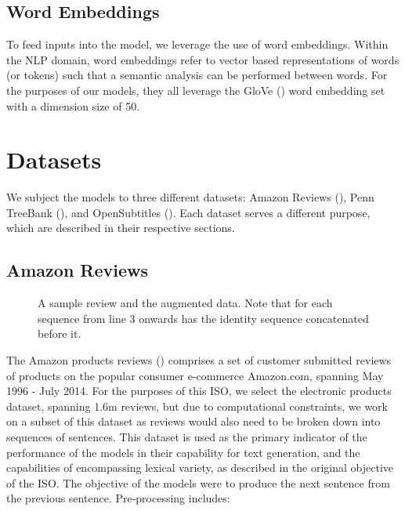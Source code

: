 \documentclass[12pt,twoside]{report}
\begin{document}
\subsection*{Word Embeddings}
\label{word_embeddings}

To feed inputs into the model, we leverage the use of word embeddings. Within the NLP domain, word embeddings refer to vector based representations of words (or tokens) such that a semantic analysis can be performed between words. For the purposes of our models, they all  leverage the GloVe (\cite{pennington_glove:_2014}) word embedding set with a dimension size of 50.

\section{Datasets}

We subject the models to three different datasets: Amazon Reviews (\cite{he_ups_2016}), Penn TreeBank (\cite{marcus_building_2002}), and OpenSubtitles (\cite{lison_opensubtitles2016:_2016}). Each dataset serves a different purpose, which are described in their respective sections.

\subsection{Amazon Reviews}

\begin{figure}[!ht]
	\centering
	
	
	\caption{A sample review and the augmented data. Note that for each sequence from line 3 onwards has the identity sequence concatenated before it. \label{ex_dataset:amazon}}
\end{figure}

The Amazon products reviews (\cite{he_ups_2016}) comprises a set of customer submitted reviews of products on the popular consumer e-commerce Amazon.com, spanning May 1996 - July 2014. For the purposes of this ISO, we select the electronic products dataset, spanning 1.6m reviews, but due to computational constraints, we work on a subset of this dataset as reviews would also need to be broken down into sequences of sentences. This dataset is used as the primary indicator of the performance of the models in their capability for text generation, and the capabilities of encompassing lexical variety, as described in the original objective of the ISO. The objective of the models were to produce the next sentence from the previous sentence. Pre-processing includes:
\end{document}
